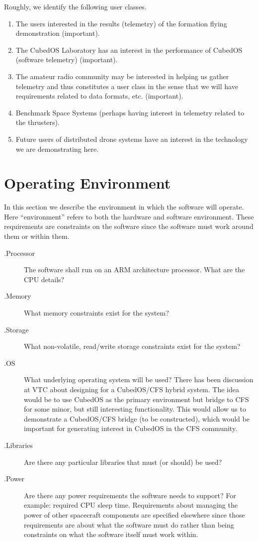Roughly, we identify the following user classes.
\begin{enumerate}
\item The users interested in the results (telemetry) of the formation flying demonstration
  (important).
\item The CubedOS Laboratory has an interest in the performance of CubedOS (software telemetry)
  (important).
\item The amateur radio community may be interested in helping us gather telemetry and thus
  constitutes a user class in the sense that we will have requirements related to data formats,
  etc. (important).
\item Benchmark Space Systems (perhaps having interest in telemetry related to the thrusters).
\item Future users of distributed drone systems have an interest in the technology we are
  demonstrating here.
\end{enumerate}

\section{Operating Environment}
In this section we describe the environment in which the software will
operate. Here ``environment'' refers to both the hardware and software
environment. These requirements are constraints on the software since
the software must work around them or within them.

\begin{description}
\item[{\varenv}.Processor] The software shall run on an ARM
  architecture processor.  What are the CPU details?
\item[{\varenv}.Memory] What memory constraints exist for the system?
\item[{\varenv}.Storage] What non-volatile, read/write storage
  constraints exist for the system?
\item[{\varenv}.OS] What underlying operating system will be used?
  There has been discussion at VTC about designing for a CubedOS/CFS
  hybrid system. The idea would be to use CubedOS as the primary
  environment but bridge to CFS for some minor, but still interesting
  functionality. This would allow us to demonstrate a CubedOS/CFS
  bridge (to be constructed), which would be important for generating
  interest in CubedOS in the CFS community.
\item[{\varenv}.Libraries] Are there any particular libraries that
  must (or should) be used?
\item[{\varenv}.Power] Are there any power requirements the software
  needs to support? For example: required CPU sleep time. Requirements
  about managing the power of other spacecraft components are
  specified elsewhere since those requirements are about what the
  software must do rather than being constraints on what the software
  itself must work within.
\end{description}


